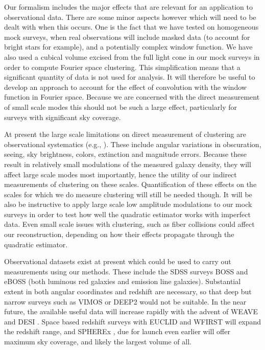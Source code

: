 \documentclass[prd,amsmath,amssymb,floatfix,superscriptaddress,nofootinbib,twocolumn]{revtex4-1}
\begin{document}
Our formalism includes the major effects that are relevant for an application to observational data. There are some minor aspects however which will need to be dealt with when this occurs. One is the fact that we have tested on homogeneous mock surveys, when real observations will include masked data (to account for bright stars for example), and a potentially complex window function. We have also used a cubical volume excised from the full light cone in our mock surveys in order to compute Fourier space clustering. This simplification means that a significant quantity of data is not used for analysis. It will therefore be useful to develop an approach to account for the effect of convolution with the window function in Fourier space. Because we are concerned with the direct measurement of small scale modes this should not be such a large effect, particularly for surveys with significant sky coverage.

At present the large scale limitations on direct measurement of clustering are observational systematics (e.g., \cite{Ho:2012sh}). These include angular variations in obscuration, seeing, sky brightness, colors, extinction and magnitude errors. Because these result in relatively small modulations of the measured galaxy density, they will affect large scale modes most importantly, hence the utility of our indirect measurements of clustering on these scales. Quantification of these effects on the scales for which we do measure clustering will still be needed though. It will be also be instructive to apply large scale low amplitude modulations to our mock surveys in order to test how well the quadratic estimator works with imperfect data. Even small scale issues with clustering, such as fiber collisions \cite{Hahn:2016kiy} could affect our reconstruction, depending on how their effects propagate through the quadratic estimator.

Observational datasets exist at present which could be used to carry out measurements using our methods. These include the SDSS surveys BOSS \cite{Dawson:2013boss} and eBOSS \cite{Dawson:2015wdb} (both luminous red galaxies and emission line galaxies). Substantial extent in both angular coordinates and redshift are necessary, so that deep but narrow surveys such as VIMOS \cite{Fevre:2014tna} or DEEP2 \cite{Coil:2005ap} would not be suitable. In the near future, the available useful data will increase rapidly with the advent of WEAVE \cite{Dalton:2014wv} and DESI \cite{DESI:2019ds}. Space based redshift surveys  with EUCLID \cite{Amiaux:2012ec} and WFIRST \cite{Wfirst:2012jg} will expand the redshift range, and SPHEREx \cite{Dore:2014cca}, due for launch even earlier will offer maximum sky coverage, and likely the largest volume of all.
\end{document}
